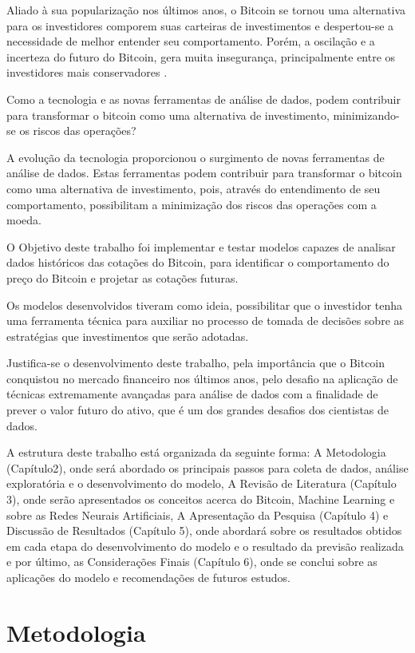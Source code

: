\documentclass[12pt]{article}
\begin{document}
Aliado à sua popularização nos últimos anos, o Bitcoin se tornou uma alternativa 
para os investidores comporem suas carteiras de investimentos e despertou-se a
necessidade de melhor entender seu comportamento. Porém, a oscilação e a 
incerteza do futuro do Bitcoin, gera muita insegurança, principalmente entre os 
investidores mais conservadores \cite{uol:2020}.

Como a tecnologia e as novas ferramentas de análise de dados, podem contribuir 
para transformar o bitcoin como uma alternativa de investimento, minimizando-se
os riscos das operações?

A evolução da tecnologia proporcionou o surgimento de novas ferramentas de 
análise de dados. Estas ferramentas podem contribuir para transformar o bitcoin 
como uma alternativa de investimento, pois, através do entendimento de seu 
comportamento, possibilitam a minimização dos riscos das operações com a moeda.

O Objetivo deste trabalho foi implementar e testar modelos capazes de analisar
dados históricos das cotações do Bitcoin, para identificar o comportamento do 
preço do Bitcoin e projetar as cotações futuras.

Os modelos desenvolvidos tiveram como ideia, possibilitar que o investidor tenha 
uma ferramenta técnica para auxiliar no processo de tomada de decisões sobre as 
estratégias que investimentos que serão adotadas.

Justifica-se o desenvolvimento deste trabalho, pela importância que o Bitcoin
conquistou no mercado financeiro nos últimos anos, pelo desafio na aplicação de
técnicas extremamente avançadas para análise de dados com a finalidade de prever 
o valor futuro do ativo, que é um dos grandes desafios dos cientistas de dados.

A estrutura deste trabalho está organizada da seguinte forma: 
A Metodologia (Capítulo2), onde será abordado os principais passos para 
coleta de dados, análise exploratória e o desenvolvimento do modelo, A Revisão 
de Literatura (Capítulo 3), onde serão apresentados os conceitos acerca do 
Bitcoin, Machine Learning e sobre as Redes Neurais Artificiais, A Apresentação 
da Pesquisa (Capítulo 4) e Discussão de Resultados (Capítulo 5), onde abordará 
sobre os resultados obtidos em cada etapa do desenvolvimento do modelo e o 
resultado da previsão realizada e por último, as Considerações Finais 
(Capítulo 6), onde se conclui sobre as aplicações do modelo e recomendações de 
futuros estudos.


\section{Metodologia} \label{sec:firstpage}
\end{document}
